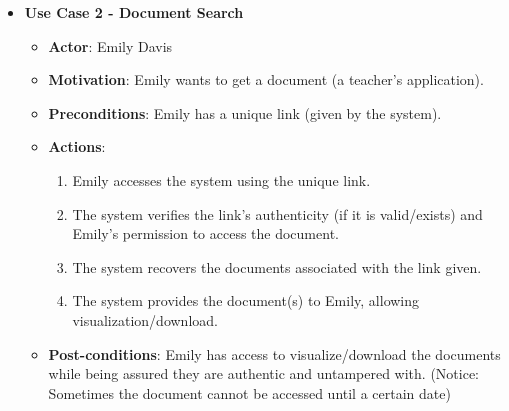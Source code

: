 \documentclass[a4paper,11pt]{article}
\begin{document}
\begin{itemize}
            \item \textbf{Use Case 2 - Document Search}
            \begin{itemize}
                \item \textbf{Actor}: Emily Davis
                \item \textbf{Motivation}: Emily wants to get a document (a teacher's application).
                \item \textbf{Preconditions}: Emily has a unique link (given by the system).
                \item \textbf{Actions}:
                \begin{enumerate}
                    \item Emily accesses the system using the unique link.
                    \item The system verifies the link's authenticity (if it is valid/exists) and Emily's permission to access the document.
                    \item The system recovers the documents associated with the link given.
                    \item The system provides the document(s) to Emily, allowing visualization/download.
                \end{enumerate}
                \item \textbf{Post-conditions}: Emily has access to visualize/download the documents while being assured they are authentic and untampered with. (Notice: Sometimes the document cannot be accessed until a certain date)
            \end{itemize}
            

\end{itemize}
\end{document}
